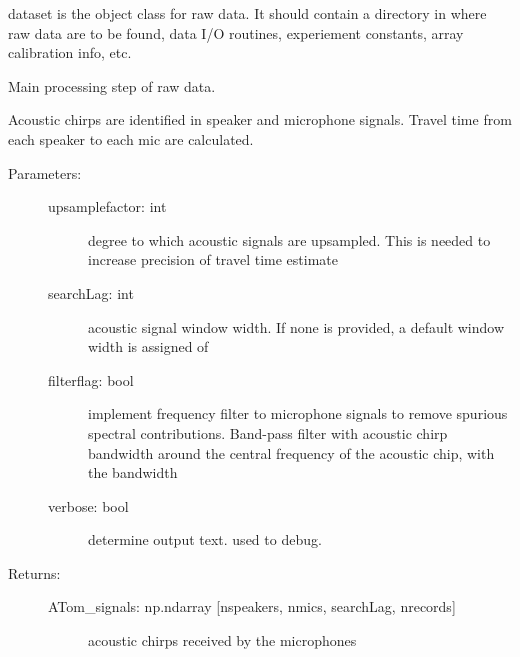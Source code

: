\documentclass[letterpaper,10pt,english]{sphinxmanual}
\begin{document}
\begin{fulllineitems}
\label{\detokenize{code:ATom.atom_functions.dataset}}
dataset is the object class for raw data. It should contain a directory in where
raw data are to be found, data I/O routines, experiement constants, array
calibration info, etc.

\begin{fulllineitems}
\label{\detokenize{code:ATom.atom_functions.dataset.extract_travel_times}}
Main processing step of raw data.

Acoustic chirps are identified in speaker and microphone signals.
Travel time from each speaker to each mic are calculated.
\begin{description}
\item[{Parameters:}] \leavevmode\begin{description}
\item[{upsamplefactor: int}] \leavevmode
degree to which acoustic signals are upsampled. This is needed to
increase precision of travel time estimate

\item[{searchLag: int}] \leavevmode
acoustic signal window width. If none is provided, a default window
width is assigned of 

\item[{filterflag: bool}] \leavevmode
implement frequency filter to microphone signals to remove spurious
spectral contributions. Band-pass filter with acoustic chirp bandwidth
around the central frequency of the acoustic chip, with the bandwidth

\item[{verbose: bool}] \leavevmode
determine output text. used to debug.

\end{description}

\item[{Returns:}] \leavevmode\begin{description}
\item[{ATom\_signals: np.ndarray {[}nspeakers, nmics, searchLag, nrecords{]}}] \leavevmode
acoustic chirps received by the microphones


\end{description}
\end{description}
\end{fulllineitems}
\end{fulllineitems}
\end{document}
